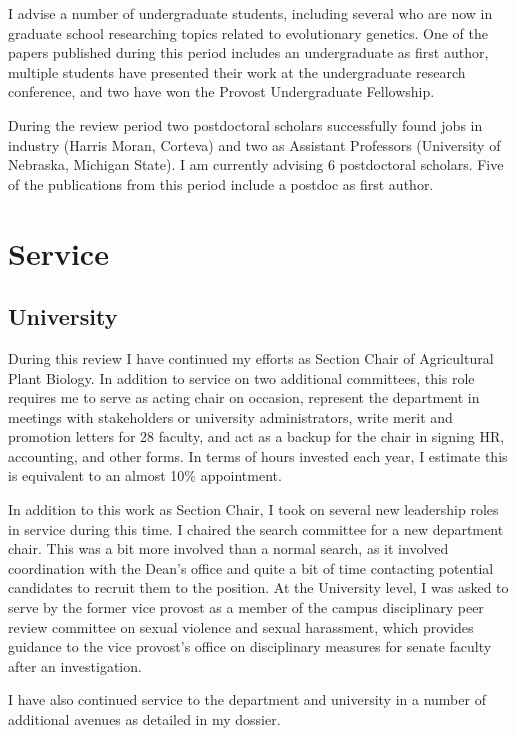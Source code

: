 \documentclass[letterpaper,10pt]{article}
\begin{document}
I advise a number of undergraduate students, including several who are now in graduate school researching topics related to evolutionary genetics.
One of the papers published during this period includes an undergraduate as first author, multiple students have presented their work at the undergraduate research conference, and two have won the Provost Undergraduate Fellowship.

During the review period two postdoctoral scholars successfully found jobs in industry (Harris Moran, Corteva) and two as Assistant Professors (University of Nebraska, Michigan State). I am currently advising 6 postdoctoral scholars.  Five of the publications from this period include a postdoc as first author.

\section*{Service}

\subsection*{University}
During this review I have continued my efforts as Section Chair of Agricultural Plant Biology. In addition to service on two additional committees, this role requires me to serve as acting chair on occasion, represent the department in meetings with stakeholders or university administrators, write merit and promotion letters for 28 faculty, and act as a backup for the chair in signing HR, accounting, and other forms. In terms of hours invested each year, I estimate this is equivalent to an almost 10\% appointment.

In addition to this work as Section Chair, I took on several new leadership roles in service during this time.  I chaired the search committee for a new department chair.  This was a bit more involved than a normal search, as it involved coordination with the Dean's office and quite a bit of time contacting potential candidates to recruit them to the position. At the University level, I was asked to serve by the former vice provost as a member of the campus disciplinary peer review committee on sexual violence and sexual harassment, which provides  guidance to the vice provost's office on disciplinary measures for senate faculty after an investigation.

I have also continued service to the department and university in a number of additional avenues as detailed in my dossier.
\end{document}
